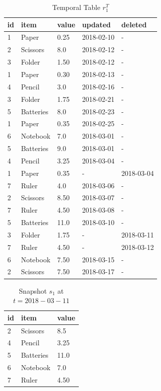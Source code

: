 \begin{center}
\begin{table}
	\centering
	\caption{Temporal Table $r_1^T$}
	\label {table:temporal_table_3}
	\begin{tabular}{p{1cm}p{2cm}p{3cm}p{3cm}p{2cm}}
		\hline
		id & item & value  & updated  & deleted\\ \hline
		1 & Paper & 0.25  & 2018-02-10  &  - \\  
		2 & Scissors & 8.0  & 2018-02-12  &  - \\
		3 & Folder & 1.50  & 2018-02-12  &  - \\
		1 & Paper & 0.30  & 2018-02-13  &  - \\
		4 & Pencil & 3.0  & 2018-02-16  &  - \\
		3 & Folder & 1.75  & 2018-02-21  &  - \\
		5 & Batteries & 8.0  & 2018-02-23  &  - \\
		1 & Paper & 0.35  & 2018-02-25  &  - \\
		6 & Notebook & 7.0  & 2018-03-01  &  - \\
		5 & Batteries & 9.0  & 2018-03-01  &  - \\
		4 & Pencil & 3.25  & 2018-03-04  &  - \\
		1 & Paper & 0.35  &  - &  2018-03-04 \\
		7 & Ruler & 4.0  & 2018-03-06  &  - \\
		2 & Scissors & 8.50  & 2018-03-07  &  - \\
		7 & Ruler & 4.50  & 2018-03-08  &  -\\
		5 & Batteries & 11.0  & 2018-03-10 & - \\
		3 & Folder & 1.75  & - & 2018-03-11 \\
		7 & Ruler & 4.50  & -  &  2018-03-12 \\
		6 & Notebook & 7.50  & 2018-03-15 & - \\ 
		2 & Scissors & 7.50  & 2018-03-17 & - \\ \hline
	\end{tabular}
\end{table}
\begin{table}
	\centering
	\caption{Snapshot $s_1$ at $t = 2018-03-11$}
	\label{table:snapshot_s1}
	\begin{tabular}{p{4cm}p{4cm}p{4cm}}
		\hline
		id & item  & value  \\ \hline
		2 & Scissors & 8.5   \\ 
		4 & Pencil & 3.25   \\ 
		5 & Batteries & 11.0   \\ 
		6 & Notebook & 7.0 \\ 
		7 & Ruler & 4.50   \\ \hline
	\end{tabular}
\end{table}
\end{center}

